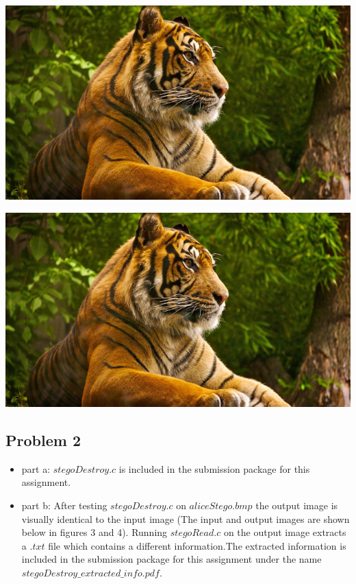\documentclass[12pt]{article}
\begin{document}
			\begin{minipage}{0.6\linewidth}
					\includegraphics[width=\linewidth]{1.png}
				\end{minipage}
				\hfill
				\begin{minipage}{0.6\linewidth}
					\includegraphics[width=\linewidth]{2.png}
				\end{minipage}
			
		\subsection{Problem 2}
			
			\begin{itemize}
				\item part a: $stegoDestroy.c$ is included in the submission package for this assignment. 
				\item part b: After testing $stegoDestroy.c$ on $aliceStego.bmp$ the output image is visually identical to the input image (The input and output images are shown below in figures 3 and 4). Running $ stegoRead.c $ on the output image extracts a $.txt$ file which contains a different information.The extracted information is included in the submission package for this assignment under the name $stegoDestroy\_extracted\_info.pdf$.
			\end{itemize}
			
\end{document}
